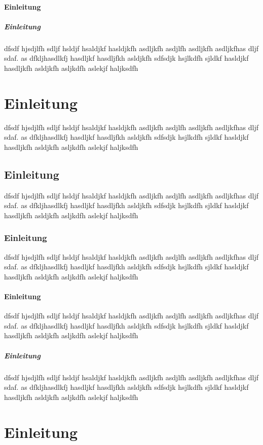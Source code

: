\documentclass[ngerman,pdf]{wkcms}    %
\begin{document}
\paragraph*{Einleitung}
\subparagraph*{Einleitung}
dfsdf hjsdjlfh sdljf hsldjf hsaldjkf hasldjkfh asdljkfh asdjlfh asdljkfh
asdljkfhas dljf sdaf. as dfkljhasdlkfj hasdljkf hasdljfkh asldjkfh sdfsdjk
hsjlkdfh sjldkf hasldjkf hasdljkfh asldjkfh asljkdfh aslekjf haljksdfh

\section*{Einleitung}
dfsdf hjsdjlfh sdljf hsldjf hsaldjkf hasldjkfh asdljkfh asdjlfh asdljkfh
asdljkfhas dljf sdaf. as dfkljhasdlkfj hasdljkf hasdljfkh asldjkfh sdfsdjk
hsjlkdfh sjldkf hasldjkf hasdljkfh asldjkfh asljkdfh aslekjf haljksdfh

\subsection*{Einleitung}
dfsdf hjsdjlfh sdljf hsldjf hsaldjkf hasldjkfh asdljkfh asdjlfh asdljkfh
asdljkfhas dljf sdaf. as dfkljhasdlkfj hasdljkf hasdljfkh asldjkfh sdfsdjk
hsjlkdfh sjldkf hasldjkf hasdljkfh asldjkfh asljkdfh aslekjf haljksdfh

\subsubsection*{Einleitung}
dfsdf hjsdjlfh sdljf hsldjf hsaldjkf hasldjkfh asdljkfh asdjlfh asdljkfh
asdljkfhas dljf sdaf. as dfkljhasdlkfj hasdljkf hasdljfkh asldjkfh sdfsdjk
hsjlkdfh sjldkf hasldjkf hasdljkfh asldjkfh asljkdfh aslekjf haljksdfh

\paragraph*{Einleitung}
dfsdf hjsdjlfh sdljf hsldjf hsaldjkf hasldjkfh asdljkfh asdjlfh asdljkfh
asdljkfhas dljf sdaf. as dfkljhasdlkfj hasdljkf hasdljfkh asldjkfh sdfsdjk
hsjlkdfh sjldkf hasldjkf hasdljkfh asldjkfh asljkdfh aslekjf haljksdfh

\subparagraph*{Einleitung}
dfsdf hjsdjlfh sdljf hsldjf hsaldjkf hasldjkfh asdljkfh asdjlfh asdljkfh
asdljkfhas dljf sdaf. as dfkljhasdlkfj hasdljkf hasdljfkh asldjkfh sdfsdjk
hsjlkdfh sjldkf hasldjkf hasdljkfh asldjkfh asljkdfh aslekjf haljksdfh

\newpage

\section{Einleitung}
\end{document}
